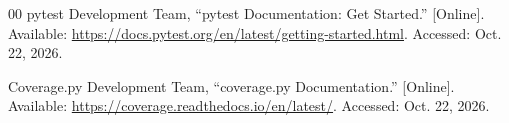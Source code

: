 \documentclass[conference]{IEEEtran}
\begin{document}
\begin{thebibliography}{00}
pytest Development Team, ``pytest Documentation: Get Started.'' [Online]. Available: \url{https://docs.pytest.org/en/latest/getting-started.html}. Accessed: Oct. 22, 2026.

Coverage.py Development Team, ``coverage.py Documentation.'' [Online]. Available: \url{https://coverage.readthedocs.io/en/latest/}. Accessed: Oct. 22, 2026.

\end{thebibliography}
\end{document}
